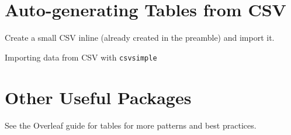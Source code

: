 \documentclass{article}
\begin{document}
\clearpage
\section{Auto-generating Tables from CSV}
Create a small CSV inline (already created in the preamble) and import it.

\begin{table}[htbp]
\centering
{}
\caption{Importing data from CSV with \texttt{csvsimple}}
\label{tab:csvsimple}
\end{table}

\clearpage
\section{Other Useful Packages}
See the Overleaf guide for tables for more patterns and best practices.
\end{document}
